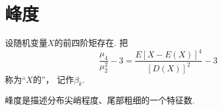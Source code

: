 \section{峰度}
\begin{definition}
设随机变量\(X\)的前四阶矩存在.
把\[
	\frac{\mu_4}{\mu_2^2}-3
	=\frac{E[X-E(X)]^4}{[D(X)]^2}-3
\]称为“\(X\)的”，
记作\(\beta_k\).
\end{definition}

峰度是描述分布尖峭程度、尾部粗细的一个特征数.

